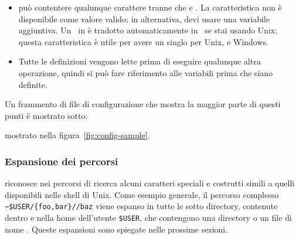 \documentclass{article}
\begin{document}
\begin{itemize}
\item {} può contentere qualunque carattere tranne che \code{\%}
  e . La caratteristica 
  non è disponibile come valore valido; in alternativa, devi usare una
  variabile aggiuntiva. Un \samp{;}\ in  è tradotto
  automaticamente in \samp{:}\ se stai usando Unix; questa caratteristica
  è utile per avere un singlo  per Unix,  e
  Windows.
\item
  Tutte le definizioni vengono lette prima di eseguire qualunque altra
  operazione, quindi si può fare riferimento alle variabili prima che
  siano definite.
\end{itemize}
Un frammento di file di configurazione che mostra la maggior parte di
questi punti è
\ifSingleColumn
mostrato sotto:


\else
mostrato nella figura~\ref{fig:config-sample}.
\fi

\subsubsection{Espansione dei percorsi}
\label{sec:path-expansion}

\KPS{} riconosce nei percorsi di ricerca alcuni caratteri speciali e costrutti
simili a quelli disponibili nelle shell di Unix. Come esempio generale, il
percorso complesso \verb+~$USER/{foo,bar}//baz+ viene espanso in tutte le
sotto directory, contenute dentro  e  nella home
dell'utente \texttt{\$USER}, che contengono una directory o un file di
nome . Queste espansioni sono spiegate nelle prossime sezioni.
\end{document}
